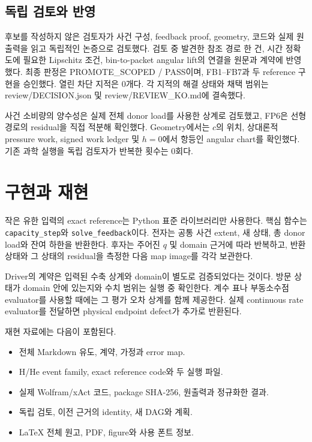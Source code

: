 \documentclass[11pt,a4paper]{article}
\providecommand{\tightlist}{\setlength{\itemsep}{2pt}\setlength{\parskip}{0pt}}
\begin{document}
\hypertarget{uxb3c5uxb9bd-uxac80uxd1a0uxc640-uxbc18uxc601}{%
\subsection{독립 검토와 반영}\label{uxb3c5uxb9bd-uxac80uxd1a0uxc640-uxbc18uxc601}}

후보를 작성하지 않은 검토자가 사건 구성, feedback proof, geometry, 코드와 실제 원출력을 읽고 독립적인 논증으로 검토했다. 검토 중 발견한 참조 경로 한 건, 시간 정확도에 필요한 Lipschitz 조건, bin-to-packet angular lift의 연결을 원문과 계약에 반영했다. 최종 판정은 PROMOTE\_SCOPED / PASS이며, FB1--FB7과 두 reference 구현을 승인했다. 열린 차단 지적은 0개다. 각 지적의 해결 상태와 채택 범위는 review/DECISION.json 및 review/REVIEW\_KO.md에 결속했다.

사건 소비량의 양수성은 실제 전체 donor load를 사용한 상계로 검토했고, FP6은 선형 경로의 residual을 직접 적분해 확인했다. Geometry에서는 \(c\)의 위치, 상대론적 pressure work, signed work ledger 및 \(h=0\)에서 항등인 angular chart를 확인했다. 기존 과학 실행을 독립 검토자가 반복한 횟수는 0회다.

\hypertarget{uxad6cuxd604uxacfc-uxc7acuxd604}{%
\section{구현과 재현}\label{uxad6cuxd604uxacfc-uxc7acuxd604}}

작은 유한 입력의 exact reference는 Python 표준 라이브러리만 사용한다. 핵심 함수는 \texttt{capacity\_step}와 \texttt{solve\_feedback}이다. 전자는 공통 사건 extent, 새 상태, 총 donor load와 잔여 하한을 반환한다. 후자는 주어진 \(q\) 및 domain 근거에 따라 반복하고, 반환 상태와 그 상태의 residual을 측정한 다음 map image를 각각 보관한다.

Driver의 계약은 입력된 수축 상계와 domain이 별도로 검증되었다는 것이다. 방문 상태가 domain 안에 있는지와 수치 범위는 실행 중 확인한다. 계수 표나 부동소수점 evaluator를 사용할 때에는 그 평가 오차 상계를 함께 제공한다. 실제 continuous rate evaluator를 전달하면 physical endpoint defect가 추가로 반환된다.

재현 자료에는 다음이 포함된다.

\begin{itemize}
\tightlist
\item
  전체 Markdown 유도, 계약, 가정과 error map.
\item
  H/He event family, exact reference code와 두 실행 파일.
\item
  실제 Wolfram/xAct 코드, package SHA-256, 원출력과 정규화한 결과.
\item
  독립 검토, 이전 근거의 identity, 새 DAG와 계획.
\item
  LaTeX 전체 원고, PDF, figure와 사용 폰트 정보.
\end{itemize}
\end{document}
